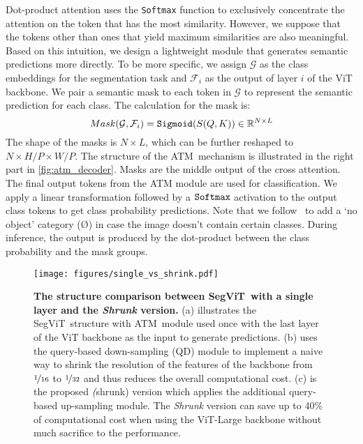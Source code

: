 \documentclass{article}
\def\R{{\mathbb R}}
\def\atm{ATM}
\def\seg{SegViT}
\begin{document}
Dot-product attention uses the {\tt Softmax} function to exclusively concentrate the attention on the token that has the most similarity. However, we suppose that the tokens other than ones that yield maximum similarities are also meaningful. Based on this intuition, we design a lightweight module that generates semantic predictions more directly. To be more specific, we assign $\mathcal{G}$ as the class embeddings for
the segmentation task and $\mathcal{F}_{i}$ as the output of layer $i$ of the ViT backbone.
We pair a semantic mask to each token in $\mathcal{G}$ to represent the semantic prediction for each class.
The calculation for the mask is:
\begin{equation}
        Mask(\mathcal{G}, \mathcal{F}_{i}) = {\tt Sigmoid}(S(Q, K)) \in \R^{N \times L}
\end{equation}
The shape of the masks is $N\times L$, which can be further reshaped to $N\times H/P \times W/P $. 
The structure of the \atm\ mechanism is illustrated in the right part in \cref{fig:atm_decoder}. Masks are the middle output of the cross attention. The final output tokens from the ATM module are used for classification. We apply a linear transformation followed by a $\tt Softmax$ activation to the output class tokens to get class probability predictions. Note that we follow~\cite{maskformer} to add a `no object' category (\O) in case the image doesn't contain certain classes. During inference, the output is produced by the dot-product between the class probability and the mask groups. 


\begin{figure}
    \centering
    \texttt{[image: figures/single\_vs\_shrink.pdf]}
    \caption{\textbf{The structure comparison between \seg\ with a single layer and the \emph{Shrunk} version.}
    (a) illustrates the \seg\ structure with \atm\ module used once with the last layer of the ViT backbone as the input to generate predictions.
    (b) uses the query-based down-sampling (QD) module to implement a naive way to
    shrink the resolution of the features of the backbone from $\nicefrac{1}{16}$ to $\nicefrac{1}{32}$ and thus reduces the overall computational cost. 
    (c) is the proposed \emph(shrunk) version which applies the additional query-based up-sampling module.
    The \emph{Shrunk} version can save up to 40\% of computational cost when using the ViT-Large backbone without much sacrifice to the performance.
    }
    \label{fig:struct}
\end{figure}
\end{document}
